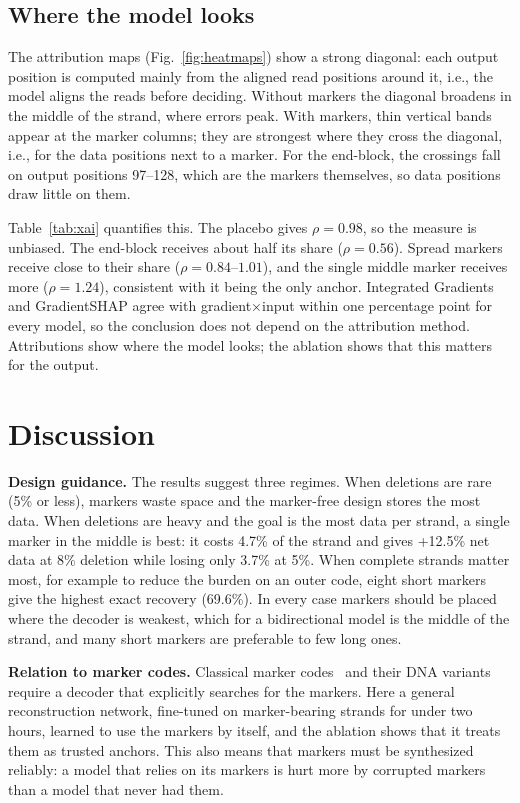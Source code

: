 \subsection{Where the model looks}
The attribution maps (Fig.~\ref{fig:heatmaps}) show a strong diagonal: each output position is computed mainly from the
aligned read positions around it, i.e., the model aligns the reads before deciding. Without markers the diagonal
broadens in the middle of the strand, where errors peak. With markers, thin vertical bands appear at the marker columns;
they are strongest where they cross the diagonal, i.e., for the data positions next to a marker. For the end-block, the
crossings fall on output positions 97--128, which are the markers themselves, so data positions draw little on them.

Table~\ref{tab:xai} quantifies this. The placebo gives $\rho=0.98$, so the measure is unbiased. The end-block receives
about half its share ($\rho=0.56$). Spread markers receive close to their share ($\rho=0.84$--$1.01$), and the single
middle marker receives more ($\rho=1.24$), consistent with it being the only anchor. Integrated Gradients and
GradientSHAP agree with gradient$\times$input within one percentage point for every model, so the conclusion does not
depend on the attribution method. Attributions show where the model looks; the ablation shows that this matters for the
output.



\section{Discussion}

\textbf{Design guidance.} The results suggest three regimes. When deletions are rare (5\% or less), markers waste space
and the marker-free design stores the most data. When deletions are heavy and the goal is the most data per strand, a
single marker in the middle is best: it costs 4.7\% of the strand and gives +12.5\% net data at 8\% deletion while losing
only 3.7\% at 5\%. When complete strands matter most, for example to reduce the burden on an outer code, eight short
markers give the highest exact recovery (69.6\%). In every case markers should be placed where the decoder is weakest,
which for a bidirectional model is the middle of the strand, and many short markers are preferable to few long ones.

\textbf{Relation to marker codes.} Classical marker codes~\cite{sellers1962,ratzer2005} and their DNA
variants~\cite{tong2023,haghighat2025} require a decoder that explicitly searches for the markers. Here a general
reconstruction network, fine-tuned on marker-bearing strands for under two hours, learned to use the markers by itself,
and the ablation shows that it treats them as trusted anchors. This also means that markers must be synthesized reliably:
a model that relies on its markers is hurt more by corrupted markers than a model that never had them.

